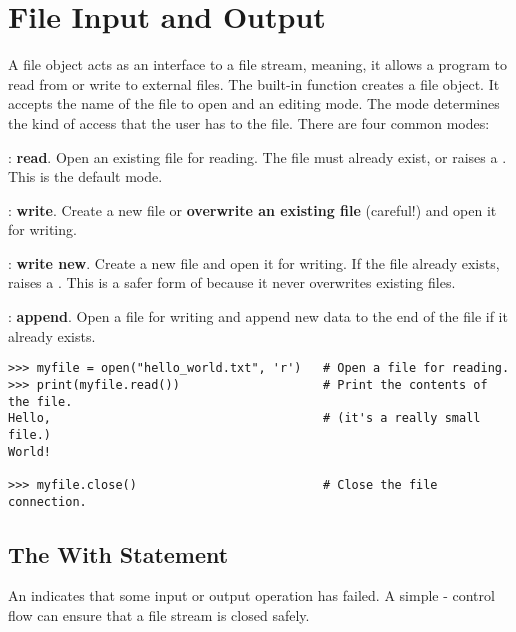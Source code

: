 \section*{File Input and Output} %

A file object acts as an interface to a file stream, meaning, it allows a program to read from or write to external files.
The built-in function  creates a file object.
It accepts the name of the file to open and an editing mode.
The mode determines the kind of access that the user has to the file.
There are four common modes:
%
\begin{description}
\item {}: \textbf{read}.
Open an existing file for reading.
The file must already exist, or  raises a .
This is the default mode.
\item {}: \textbf{write}.
Create a new file or \textbf{overwrite an existing file} (careful!) and open it for writing.
\item {}: \textbf{write new}.
Create a new file and open it for writing.
If the file already exists,  raises a .
This is a safer form of  because it never overwrites existing files.
\item {}: \textbf{append}.
Open a file for writing and append new data to the end of the file if it already exists.
\end{description}

\begin{lstlisting}
>>> myfile = open("hello_world.txt", 'r')   # Open a file for reading.
>>> print(myfile.read())                    # Print the contents of the file.
Hello,                                      # (it's a really small file.)
World!

>>> myfile.close()                          # Close the file connection.
\end{lstlisting}


\subsection*{The With Statement} %

An  indicates that some input or output operation has failed.
A simple - control flow can ensure that a file stream is closed safely.

